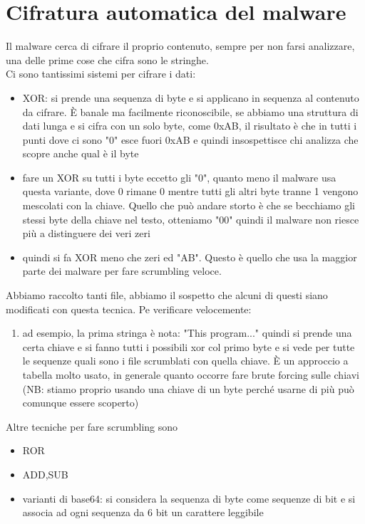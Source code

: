 \documentclass[12pt, oneside]{extbook}
\begin{document}
\section{Cifratura automatica del malware}
Il malware cerca di cifrare il proprio contenuto, sempre per non farsi analizzare, una delle prime cose che cifra sono le stringhe.\\Ci sono tantissimi sistemi per cifrare i dati:
\begin{itemize}
	\item XOR: si prende una sequenza di byte e si applicano in sequenza al contenuto da cifrare. È banale ma facilmente riconoscibile, se abbiamo una struttura di dati lunga e si cifra con un solo byte, come 0xAB, il risultato è che in tutti i punti dove ci sono "0" esce fuori 0xAB e quindi insospettisce chi analizza che scopre anche qual è il byte
	\item fare un XOR su tutti i byte eccetto gli "0", quanto meno il malware usa questa variante, dove 0 rimane 0 mentre tutti gli altri byte tranne 1 vengono mescolati con la chiave. Quello che può andare storto è che se becchiamo gli stessi byte della chiave nel testo, otteniamo "00" quindi il malware non riesce più a distinguere dei veri zeri
	\item quindi si fa XOR meno che zeri ed "AB". Questo è quello che usa la maggior parte dei malware per fare scrumbling veloce.
\end{itemize}
Abbiamo raccolto tanti file, abbiamo il sospetto che alcuni di questi siano modificati con questa tecnica. Pe verificare velocemente:
\begin{enumerate}
	\item ad esempio, la prima stringa è nota: "This program..." quindi si prende una certa chiave e si fanno tutti i possibili xor col primo byte e si vede per tutte le sequenze quali sono i file scrumblati con quella chiave. È un approccio a tabella molto usato, in generale quanto occorre fare brute forcing sulle chiavi (NB: stiamo proprio usando una chiave di un byte perché usarne di più può comunque essere scoperto)
\end{enumerate}
Altre tecniche per fare scrumbling sono
\begin{itemize}
	\item ROR
	\item ADD,SUB
	\item varianti di base64: si considera la sequenza di byte come sequenze di bit e si associa ad ogni sequenza da 6 bit un carattere leggibile
\end{itemize}
\end{document}
